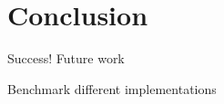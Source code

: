 \documentclass[paper.tex]{subfiles}
\begin{document}
\section{Conclusion}
\label{sec:conclusion}

\begin{todos}
  \todo Success!
  \todo Future work
  \begin{todos}
    \todo Benchmark different implementations
  \end{todos}
\end{todos}
\end{document}
